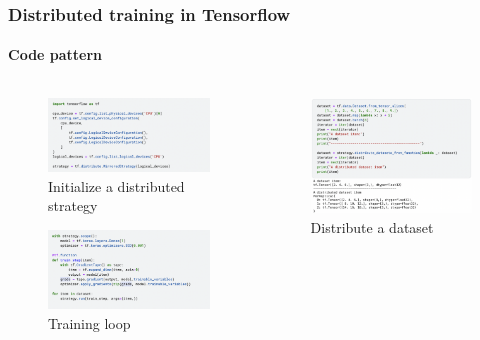 \documentclass[11pt]{beamer}
\begin{document}
\begin{frame}
\frametitle{Distributed training in Tensorflow}
\framesubtitle{Code pattern}
\begin{columns}[c]
\begin{column}{.5\textwidth}
\begin{figure}[!h]
\centering
\caption{Initialize a distributed strategy}
\vspace*{-15pt}
\includegraphics[scale=0.23]{images/code/tf-strategy.png}
\end{figure}
\vspace*{-15pt}
\begin{figure}[!h]
\centering
\caption{Training loop}
\vspace*{-15pt}
\includegraphics[scale=.23]{images/code/train-loop-tf.png}
\end{figure}
\end{column}
\begin{column}{.5\textwidth}
\begin{figure}[!h]
	\centering
	\caption{Distribute a dataset}
	\vspace*{-15pt}
	\includegraphics[scale=0.23]{images/code/dist-dataset.png}

\end{figure}
\end{column}
\end{columns}
\end{frame}
\end{document}
